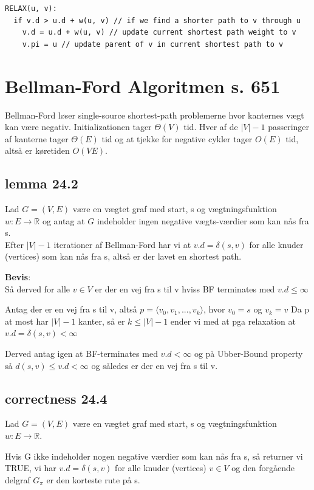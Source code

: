 \documentclass[11pt,a4paper]{report}
\theoremstyle{plain}
\theoremstyle{definition}
\theoremstyle{remark}
\numberwithin{equation}{section}
\begin{document}
\begin{lstlisting}
RELAX(u, v):
  if v.d > u.d + w(u, v) // if we find a shorter path to v through u
    v.d = u.d + w(u, v) // update current shortest path weight to v
    v.pi = u // update parent of v in current shortest path to v
\end{lstlisting}

\section{Bellman-Ford Algoritmen s. 651}
Bellman-Ford løser single-source shortest-path problemerne hvor kanternes vægt kan være negativ.
Initializationen tager $\Theta(V) $ tid. Hver af de $|V|-1$ passeringer af kanterne tager $\Theta(E) $ tid og at tjekke for negative cykler tager $O(E)$ tid, altså er køretiden $O(V E)$.

\subsection{lemma 24.2}
Lad $G=(V,E)$ være en vægtet graf med start, s og vægtningsfunktion $w: E \rightarrow \mathbb{R}$ og antag at $G$ indeholder ingen negative vægts-værdier som kan nås fra s.\\
Efter $|V|-1$ iterationer af Bellman-Ford har vi at $v.d = \delta(s,v)$ for alle knuder (vertices) som kan nås fra s, altså er der lavet en shortest path.

\textbf{Bevis}:\\
Så derved for alle $v \in V$ er der en vej fra s til v hviss BF terminates med $v.d\leq \infty$

Antag der er en vej fra s til v, altså $p=\langle v_0, v_1,...,v_k \rangle$, hvor $v_0 = s$ og $v_k = v$ Da p at most har $|V| - 1$ kanter, så er $k \leq |V| - 1$ ender vi med at pga relaxation at $v.d = \delta(s,v) < \infty$

Derved antag igen at BF-terminates med $v.d < \infty$ og på Ubber-Bound property så $d(s,v) \leq v.d < \infty$ og således er der en vej fra s til v.

\subsection{correctness 24.4}
Lad $G=(V,E)$ være en vægtet graf med start, s og vægtningsfunktion $w: E \rightarrow \mathbb{R}$.

Hvis G ikke indeholder nogen negative værdier som kan nås fra s, så returner vi TRUE, vi har $v.d=\delta(s,v)$ for alle knuder (vertices) $v \in V$ og den forgående delgraf $G_{\pi}$ er den korteste rute på s.
\end{document}
